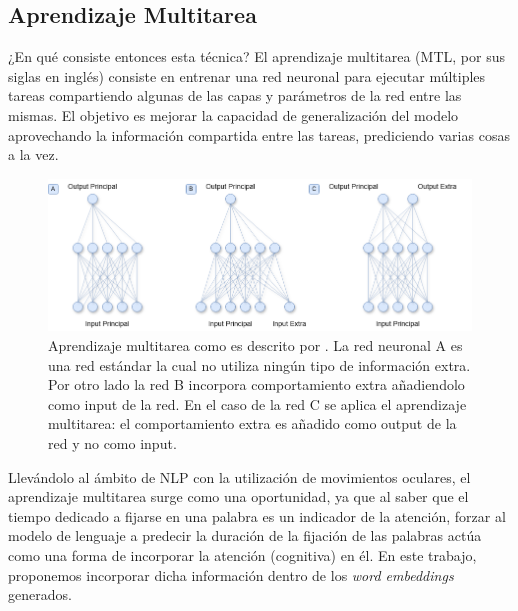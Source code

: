 \subsection{Aprendizaje Multitarea}

¿En qué consiste entonces esta técnica? El aprendizaje multitarea (MTL, por sus siglas en inglés) consiste en entrenar una red neuronal para ejecutar múltiples tareas compartiendo algunas de las capas y parámetros de la red entre las mismas. El objetivo es mejorar la capacidad de generalización del modelo aprovechando la información compartida entre las tareas, prediciendo varias cosas a la vez. \parencite{Caruana1997}

\begin{figure}[H]
    \centering
    \includegraphics[width=1\textwidth]{imagenes/multitarea.png}
    \caption{Aprendizaje multitarea como es descrito por \textcite{Caruana1997}. La red neuronal A es una red estándar la cual no utiliza ningún tipo de información extra. Por otro lado la red B incorpora comportamiento extra añadiendolo como input de la red. En el caso de la red C se aplica el aprendizaje multitarea: el comportamiento extra es añadido como output de la red y no como input.}
    \label{fig:multitarea}
\end{figure}

Llevándolo al ámbito de NLP con la utilización de movimientos oculares, el aprendizaje multitarea surge como una oportunidad, ya que al saber que el tiempo dedicado a fijarse en una palabra es un indicador de la atención, forzar al modelo de lenguaje a predecir la duración de la fijación de las palabras actúa como una forma de incorporar la atención (cognitiva) en él. En este trabajo, proponemos incorporar dicha información dentro de los \textit{word embeddings} generados.

